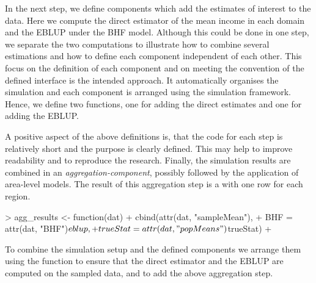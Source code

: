 \documentclass[article]{ajs}
\begin{document}
In the next step, we define components which add the estimates of interest to the data. Here we compute the direct estimator of the mean income in each domain and the EBLUP under the BHF model. Although this could be done in one step, we separate the two computations to illustrate how to combine several estimations and how to define each component independent of each other. This focus on the definition of each component and  on meeting the convention of the defined interface is the intended approach. It automatically organises the simulation and each component is arranged using the simulation framework. Hence, we define two functions, one for adding the direct estimates and one for adding the EBLUP.

\begin{Schunk}
\end{Schunk}

A positive aspect of the above definitions is, that the code for each step is relatively short and the purpose is clearly defined. This may help to improve readability and to reproduce the research. Finally, the simulation results are combined in an \textit{aggregation-component}, possibly followed by the application of area-level models. The result of this aggregation step is a  with one row for each region.

\begin{Schunk}
\begin{Sinput}
> agg_results <- function(dat) {
+   cbind(attr(dat, "sampleMean"),
+         BHF = attr(dat, "BHF")$eblup,
+         trueStat = attr(dat, "popMeans")$trueStat)
+ }
\end{Sinput}
\end{Schunk}

To combine the simulation setup and the defined components we arrange them using the function  to ensure that the direct estimator and the EBLUP are computed on the sampled data, and  to add the above aggregation step.
\end{document}

